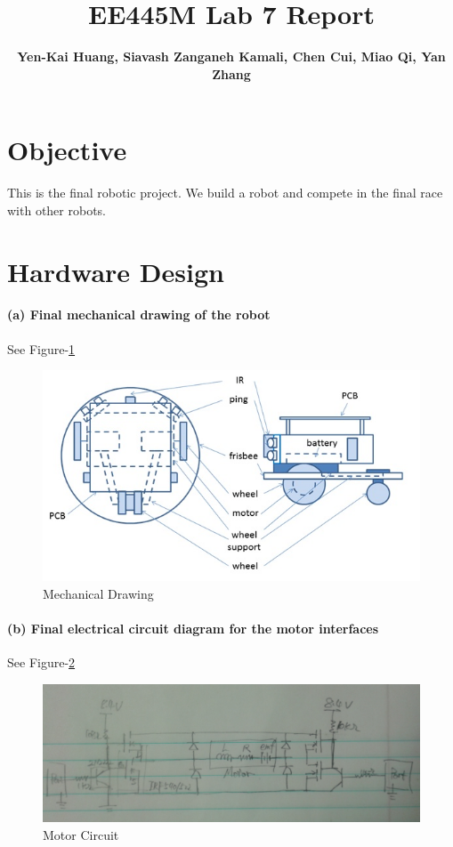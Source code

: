 \documentclass[a4paper]{article}
\newlength{\pic}
\begin{document}
\title{EE445M Lab 7 Report}
\author{\bfseries Yen-Kai Huang, Siavash Zanganeh Kamali, Chen Cui, Miao Qi, Yan Zhang}
\maketitle

\section{Objective} This is the final robotic project. We build a robot and compete in the final race with other robots.

\section{Hardware Design}

\paragraph{(a) Final mechanical drawing of the robot }
See Figure-\ref{mech}

\setlength{\pic}{\textwidth}
\begin{figure}[htp]
\center
\includegraphics[width=\pic]{circuits/mechanical_drawing}
\caption{Mechanical Drawing} \label{mech}
\end{figure}

\paragraph{(b) Final electrical circuit diagram for the motor interfaces }
See Figure-\ref{pwm}

\setlength{\pic}{12cm}
\begin{figure}[htp]
\center
\includegraphics[width=\pic]{circuits/Alternate_H-bridge}
\caption{Motor Circuit} \label{pwm}
\end{figure}
\end{document}
